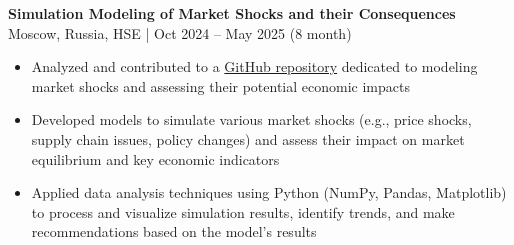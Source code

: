 \textbf{Simulation Modeling of Market Shocks and their Consequences} \hfill Moscow, Russia, HSE | Oct 2024 – May 2025 (8 month)
\begin{itemize}[noitemsep, topsep=0pt, partopsep=0pt, parsep=0pt]
    \item Analyzed and contributed to a \href{https://github.com/bognik002/2D-ABM}{GitHub repository} dedicated to modeling market shocks and assessing their potential economic impacts
    \item Developed models to simulate various market shocks (e.g., price shocks, supply chain issues, policy changes) and assess their impact on market equilibrium and key economic indicators
    \item Applied data analysis techniques using Python (NumPy, Pandas, Matplotlib) to process and visualize simulation results, identify trends, and make recommendations based on the model's results
\end{itemize}
